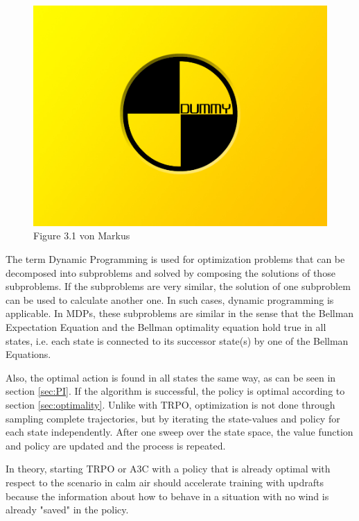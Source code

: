 \begin{figure}[h]
	\includegraphics[width=\textwidth]{src/pics/dummy.jpg}
	\caption{Figure 3.1 von Markus}
	\label{fig:RLmethods} 
\end{figure}

The term Dynamic Programming is used for optimization problems that can be decomposed into subproblems and solved by composing the solutions of those subproblems. If the subproblems are very similar, the solution of one subproblem can be used to calculate another one. In such cases, dynamic programming is applicable. In MDPs, these subproblems are similar in the sense that the Bellman Expectation Equation and the Bellman optimality equation hold true in all states, i.e. each state is connected to its successor state(s) by one of the Bellman Equations.

Also, the optimal action is found in all states the same way, as can be seen in section \ref{sec:PI}. If the algorithm is successful, the policy is optimal according to section \ref{sec:optimality}. Unlike with TRPO, optimization is not done through sampling complete trajectories, but by iterating the state-values and policy for each state independently. After one sweep over the state space, the value function and policy are updated and the process is repeated.\bigbreak

In theory, starting TRPO or A3C with a policy that is already optimal with respect to the scenario in calm air should accelerate training with updrafts because the information about how to behave in a situation with no wind is already "saved" in the policy.

